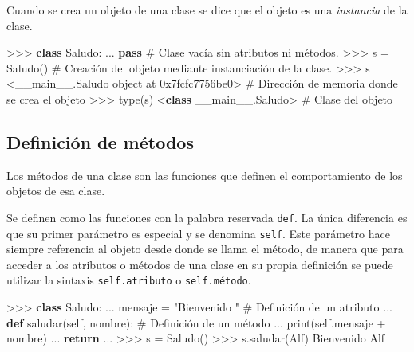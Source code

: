 \documentclass[
  spanish,
  a4paper,
]{scrreport}
\newenvironment{Shaded}{\begin{snugshade}}{\end{snugshade}}
\newcommand{\BaseNTok}[1]{\textcolor[rgb]{0.68,0.00,0.00}{#1}}
\newcommand{\BuiltInTok}[1]{\textcolor[rgb]{0.00,0.23,0.31}{#1}}
\newcommand{\CommentTok}[1]{\textcolor[rgb]{0.37,0.37,0.37}{#1}}
\newcommand{\ControlFlowTok}[1]{\textcolor[rgb]{0.00,0.23,0.31}{\textbf{#1}}}
\newcommand{\KeywordTok}[1]{\textcolor[rgb]{0.00,0.23,0.31}{\textbf{#1}}}
\newcommand{\NormalTok}[1]{\textcolor[rgb]{0.00,0.23,0.31}{#1}}
\newcommand{\OperatorTok}[1]{\textcolor[rgb]{0.37,0.37,0.37}{#1}}
\newcommand{\StringTok}[1]{\textcolor[rgb]{0.13,0.47,0.30}{#1}}
\newcommand{\VariableTok}[1]{\textcolor[rgb]{0.07,0.07,0.07}{#1}}
\begin{document}
Cuando se crea un objeto de una clase se dice que el objeto es una
\emph{instancia} de la clase.

\begin{Shaded}
\begin{Highlighting}[]
\OperatorTok{\textgreater{}\textgreater{}\textgreater{}} \KeywordTok{class}\NormalTok{ Saludo:}
\NormalTok{...     }\ControlFlowTok{pass}        \CommentTok{\# Clase vacía sin atributos ni métodos.}
\OperatorTok{\textgreater{}\textgreater{}\textgreater{}}\NormalTok{ s }\OperatorTok{=}\NormalTok{ Saludo()    }\CommentTok{\# Creación del objeto mediante instanciación de la clase.}
\OperatorTok{\textgreater{}\textgreater{}\textgreater{}}\NormalTok{ s}
\OperatorTok{\textless{}}\NormalTok{\_\_main\_\_.Saludo }\BuiltInTok{object}\NormalTok{ at }\BaseNTok{0x7fcfc7756be0}\OperatorTok{\textgreater{}}      \CommentTok{\# Dirección de memoria donde se crea el objeto}
\OperatorTok{\textgreater{}\textgreater{}\textgreater{}} \BuiltInTok{type}\NormalTok{(s)}
\OperatorTok{\textless{}}\KeywordTok{class} \StringTok{\textquotesingle{}\_\_main\_\_.Saludo\textquotesingle{}}\OperatorTok{\textgreater{}}     \CommentTok{\# Clase del objeto}
\end{Highlighting}
\end{Shaded}

\subsection{Definición de métodos}\label{definiciuxf3n-de-muxe9todos}

Los métodos de una clase son las funciones que definen el comportamiento
de los objetos de esa clase.

Se definen como las funciones con la palabra reservada \texttt{def}. La
única diferencia es que su primer parámetro es especial y se denomina
\texttt{self}. Este parámetro hace siempre referencia al objeto desde
donde se llama el método, de manera que para acceder a los atributos o
métodos de una clase en su propia definición se puede utilizar la
sintaxis \texttt{self.atributo} o \texttt{self.método}.

\begin{Shaded}
\begin{Highlighting}[]
\OperatorTok{\textgreater{}\textgreater{}\textgreater{}} \KeywordTok{class}\NormalTok{ Saludo:}
\NormalTok{...     mensaje }\OperatorTok{=} \StringTok{"Bienvenido "}            \CommentTok{\# Definición de un atributo}
\NormalTok{...     }\KeywordTok{def}\NormalTok{ saludar(}\VariableTok{self}\NormalTok{, nombre):         }\CommentTok{\# Definición de un método   }
\NormalTok{...         }\BuiltInTok{print}\NormalTok{(}\VariableTok{self}\NormalTok{.mensaje }\OperatorTok{+}\NormalTok{ nombre)}
\NormalTok{...         }\ControlFlowTok{return}
\NormalTok{... }
\OperatorTok{\textgreater{}\textgreater{}\textgreater{}}\NormalTok{ s }\OperatorTok{=}\NormalTok{ Saludo()}
\OperatorTok{\textgreater{}\textgreater{}\textgreater{}}\NormalTok{ s.saludar(}\StringTok{\textquotesingle{}Alf\textquotesingle{}}\NormalTok{)}
\NormalTok{Bienvenido Alf}
\end{Highlighting}
\end{Shaded}
\end{document}
